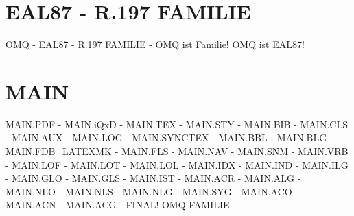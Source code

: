 \documentclass{MAIN}
\begin{document}
\maketitle
\section*{EAL87 - R.197 FAMILIE}
OMQ - EAL87 - R.197 FAMILIE - OMQ ist Familie! OMQ ist EAL87!
\section*{MAIN}
MAIN.PDF - MAIN.iQxD - MAIN.TEX - MAIN.STY - MAIN.BIB - MAIN.CLS - MAIN.AUX - MAIN.LOG - MAIN.SYNCTEX - MAIN.BBL - MAIN.BLG - MAIN.FDB_LATEXMK - MAIN.FLS - MAIN.NAV - MAIN.SNM - MAIN.VRB - MAIN.LOF - MAIN.LOT - MAIN.LOL - MAIN.IDX - MAIN.IND - MAIN.ILG - MAIN.GLO - MAIN.GLS - MAIN.IST - MAIN.ACR - MAIN.ALG - MAIN.NLO - MAIN.NLS - MAIN.NLG - MAIN.SYG - MAIN.ACO - MAIN.ACN - MAIN.ACG - FINAL!
\cite{omq_eal87}
\ac{OMQ}
\ac{FAMILIE}

\printindex
\printglossary
\printnomenclature
\printacronyms
\end{document}
